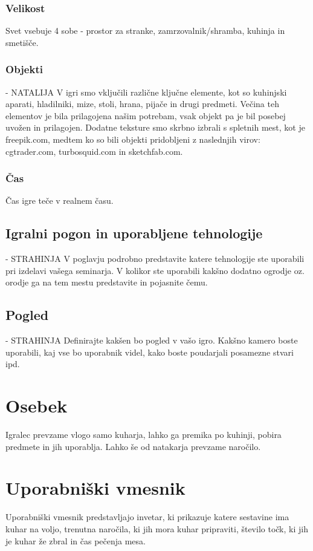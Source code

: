 \documentclass[a4paper]{article}
\begin{document}
\subsubsection{Velikost}
Svet vsebuje 4 sobe - prostor za stranke, zamrzovalnik/shramba, kuhinja in smetišče. 

\subsubsection{Objekti} - NATALIJA
V igri smo vključili različne ključne elemente, kot so kuhinjski aparati, hladilniki, mize, stoli, hrana, pijače in drugi predmeti. 
Večina teh elementov je bila prilagojena našim potrebam, vsak objekt pa je bil posebej uvožen in prilagojen. 
Dodatne teksture smo skrbno izbrali s spletnih mest, kot je freepik.com, medtem ko so bili objekti pridobljeni z naslednjih virov: cgtrader.com, turbosquid.com in sketchfab.com.

\subsubsection{Čas}
Čas igre teče v realnem času.

\subsection{Igralni pogon in uporabljene tehnologije} - STRAHINJA
V poglavju podrobno predstavite katere tehnologije ste uporabili pri izdelavi vašega seminarja. V kolikor ste uporabili kakšno dodatno ogrodje oz. orodje ga na tem mestu predstavite in pojasnite čemu.

\subsection{Pogled} - STRAHINJA
Definirajte kakšen bo pogled v vašo igro. Kakšno kamero boste uporabili, kaj vse bo uporabnik videl, kako boste poudarjali posamezne stvari ipd.

\section{Osebek}
Igralec prevzame vlogo samo kuharja, lahko ga premika po kuhinji, pobira predmete in jih uporablja. Lahko še od natakarja prevzame naročilo.

\section{Uporabniški vmesnik}
Uporabniški vmesnik predstavljajo invetar, ki prikazuje katere sestavine ima kuhar na voljo, trenutna naročila, ki jih mora kuhar pripraviti, število točk, ki jih je kuhar že zbral in čas pečenja mesa.
\end{document}
